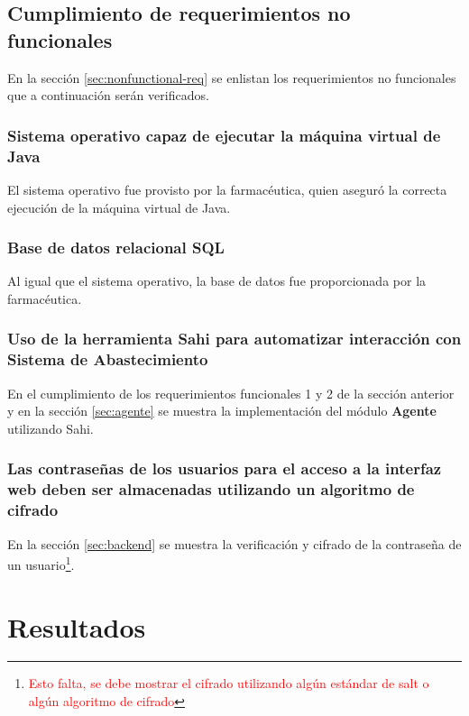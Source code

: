 \subsection{Cumplimiento de requerimientos no funcionales}
En la sección \ref{sec:nonfunctional-req} se enlistan los requerimientos no funcionales que a continuación serán verificados.

\subsubsection{Sistema operativo capaz de ejecutar la máquina virtual de Java}
El sistema operativo fue provisto por la farmacéutica, quien aseguró la correcta ejecución de la máquina virtual de Java.

\subsubsection{Base de datos relacional SQL}
Al igual que el sistema operativo, la base de datos fue proporcionada por la farmacéutica.

\subsubsection{Uso de la herramienta Sahi para automatizar interacción con Sistema de Abastecimiento}
En el cumplimiento de los requerimientos funcionales 1 y 2 de la sección anterior y en la sección \ref{sec:agente} se muestra la implementación del módulo \textbf{Agente} utilizando Sahi.

\subsubsection{Las contraseñas de los usuarios para el acceso a la interfaz web deben ser almacenadas utilizando un algoritmo de cifrado}
En la sección \ref{sec:backend} se muestra la verificación y cifrado de la contraseña de un usuario\footnote{\textcolor{red}{Esto falta, se debe mostrar el cifrado utilizando algún estándar de salt o algún algoritmo de cifrado}}.


\section{Resultados}

